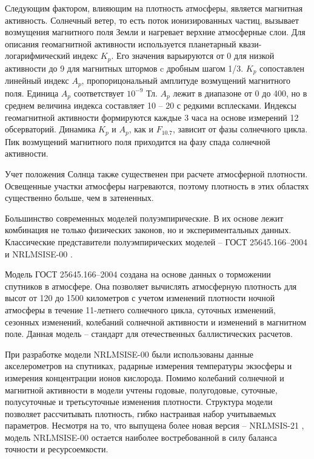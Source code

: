 Следующим фактором, влияющим на плотность атмосферы, является магнитная активность.
Солнечный ветер, то есть поток ионизированных частиц, 
вызывает возмущения магнитного поля Земли и нагревает верхние атмосферные слои.
Для описания геомагнитной активности используется планетарный квази-логарифмический индекс $K_p$.
Его значения варьируются от 0 для низкой активности до 9 для магнитных штормов c дробным шагом 1/3. 
$K_p$ сопоставлен линейный индекс $A_p$, пропорицональный амплитуде возмущений магнитного поля.
Единица $A_p$ соответствует $10^{-9}$ Тл. $A_p$ лежит в диапазоне от 0 до 400, но в среднем величина индекса составляет 10 -- 20 с редкими всплесками.
Индексы геомагнитной активности формируются каждые 3 часа на основе измерений 12 обсерваторий.
Динамика $K_p$ и $A_p$, как и $F_{10.7}$, зависит от фазы солнечного цикла.
Пик возмущений магнитного поля приходится на фазу спада солнечной активности.

Учет положения Солнца также существенен при расчете атмосферной плотности.
Освещенные участки атмосферы нагреваются, поэтому плотность в этих областях существенно
больше, чем в затененных.

Большинство современных моделей полуэмпирические. В их основе лежит комбинация не только
физических законов, но и экспериментальных данных. 
Классические представители полуэмпирических моделей 
-- ГОСТ 25645.166--2004 \cite{gost1662004} и NRLMSISE-00 \cite{picone2002}.

Модель ГОСТ 25645.166--2004 создана на основе данных о торможении спутников в атмосфере.
Она позволяет вычислять атмосферную плотность для высот от 120 до 1500 километров с учетом
изменений плотности ночной атмосферы в течение 11-летнего солнечного цикла, суточных изменений,
сезонных изменений, колебаний солнечной активности и изменений в магнитном поле.
Данная модель -- стандарт для отечественных баллистических расчетов.

При разработке модели NRLMSISE-00 были использованы данные акселерометров на спутниках,
радарные измерения температуры экзосферы и измерения концентрации ионов кислорода.
Помимо колебаний солнечной и магнитной активности в модели
учтены годовые, полугодовые, суточные, полусуточные и третьсуточные изменения плотности.
Структура модели позволяет рассчитывать плотность, гибко настраивая набор учитываемых параметров.
Несмотря на то, что выпущена более новая версия -- NRLMSIS-21 \cite{emmert2021, emmert2022}, 
модель NRLMSISE-00 остается наиболее востребованной в силу баланса точности и ресурсоемкости.

